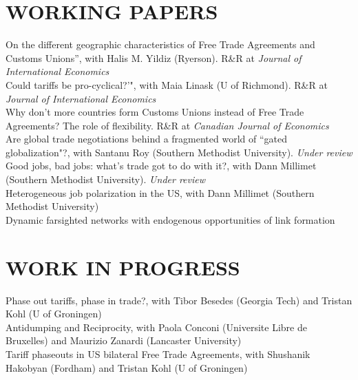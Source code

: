 \documentclass[11pt]{res}
\begin{document}
\begin{resume}
\section{WORKING PAPERS}\vspace{1.5mm}
{On the different geographic characteristics of Free Trade Agreements and Customs Unions''}, with Halis M. Yildiz (Ryerson). R\&R at \emph{Journal of International Economics}\vspace{1.5mm}\\
{Could tariffs be pro-cyclical?'"}, with Maia Linask (U of Richmond). R\&R at \emph{Journal of International Economics}\vspace{1.5mm}\\
{Why don't more countries form Customs Unions instead of Free Trade Agreements? The role of flexibility}. R\&R at \emph{Canadian Journal of Economics} \vspace{1.5mm}\\
{Are global trade negotiations behind a fragmented world of ``gated globalization"?}, with Santanu Roy (Southern Methodist University). \emph{Under review}\vspace{1.5mm}\\
{Good jobs, bad jobs: what's trade got to do with it?}, with Dann Millimet (Southern Methodist University).\emph{ Under review}\vspace{1.5mm}\\
{Heterogeneous job polarization in the US}, with Dann Millimet (Southern Methodist University)\vspace{1.5mm}\\
{Dynamic farsighted networks with endogenous opportunities of link formation} \vspace{1.5mm}\\

\section{WORK IN PROGRESS}\vspace{1.5mm}
Phase out tariffs, phase in trade?, with Tibor Besedes (Georgia Tech) and Tristan Kohl (U of Groningen) \vspace{1.5mm}\\
Antidumping and Reciprocity, with Paola Conconi (Universite Libre de Bruxelles) and Maurizio Zanardi (Lancaster University) \vspace{1.5mm}\\
Tariff phaseouts in US bilateral Free Trade Agreements, with Shushanik Hakobyan (Fordham) and Tristan Kohl (U of Groningen)\\


\end{resume}
\end{document}
